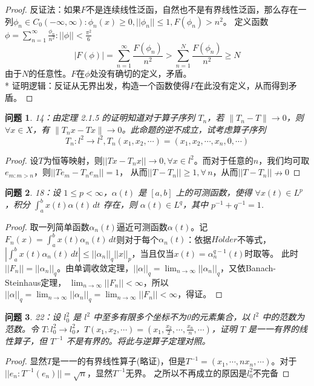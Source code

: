 \documentclass[a4paper, 12pt]{ctexart}
\newtheorem*{theorem}{问题}%
\begin{document}
\begin{proof}
反证法：如果$F$不是连续线性泛函，自然也不是有界线性泛函，那么存在一列$\phi_n \in C_0(-\infty,\infty):\phi_n(x)\geq 0,||\phi_n||\leq 1,F(\phi_n)>n^2$。
定义函数$\phi=\sum_{n=1}^\infty \frac{\phi _n}{n^2}:\lvert \lvert \phi \rvert\rvert <\frac{\pi^2}{6}$ $$|F(\phi)|=\sum_{n=1}^\infty \frac{F(\phi_{n})}{n^2} > \sum_{n=1}^N \frac{F(\phi_{n})}{n^2}\geq N$$
由于$N$的任意性。$F$在$\phi$处没有确切的定义，矛盾。
\\
* 证明逻辑：反证从无界出发，构造一个函数使得$F$在此没有定义，从而得到矛盾。
\end{proof}

\begin{theorem}
14：由定理 2.1.5 的证明知道对于算子序列 $T_n$，若 $\left\|T_n - T\right\| \rightarrow 0$，则 $\forall x \in X$，有 $\left\|T_n x - T x\right\| \rightarrow 0$。此命题的逆不成立，试考虑算子序列
$$T_n: l^2 \rightarrow l^2, T_n(x_1, x_2, \cdots) = (x_1, x_2, \cdots, x_n, 0, \cdots)$$
\end{theorem}
\begin{proof}
设$T$为恒等映射，则$||Tx-T_nx||\to 0, \forall x\in l^2$。而对于任意的$n$，我们均可取$e_{m:m>n}$，则$||Te_m-T_ne_m||=1$，
从而$||T-T_n||\geq 1,\forall \,n$，从而$||T-T_n|| \nrightarrow 0$
\end{proof}

\begin{theorem}
18：设 $1 \leqslant p < \infty$，$\alpha(t)$ 是 $[a,b]$ 上的可测函数，使得 $\forall x(t) \in L^p$，积分 $\int_{a}^{b} x(t) \alpha(t) \, dt$ 存在，则 $\alpha(t) \in L^q$，其中 $p^{-1} + q^{-1} = 1$.
\end{theorem}

\begin{proof}
取一列简单函数$\alpha_n(t)$逼近可测函数$\alpha(t)$。记$F_n(x)=\int_a^b x(t)\alpha_n(t)\,dt$则对于每个$\alpha_n(t)$：依据$H\dddot{o}lder$不等式，
$|\int_a^b x(t)\alpha_n(t)\,dt|\leq ||\alpha_n||_q||x||_p$，当且仅当$x(t)=\alpha_n^{q-1}(t)$时取等。
此时$||F_n||=||\alpha_n||_q$。由单调收敛定理，$||\alpha||_q=\lim_{n \to \infty}||\alpha_n||_q$，又依Banach-Steinhaus定理，
$\lim_{n \to \infty}||F_n||<\infty$，所以$||\alpha||_q=\lim_{n \to \infty}||\alpha_n||_q=\lim_{n \to \infty}||F_n||<\infty$，得证。
\end{proof}

\begin{theorem}
22：设 $l_{0}^{2}$ 是 $l^{2}$ 中至多有限多个坐标不为0的元素集合，以 $l^{2}$ 中的范数为范数。令 $T: l_{0}^{2} \rightarrow l_{0}^{2}$，$T(x_1, x_2, \cdots) = (x_1, \frac{x_2}{2}, \cdots, \frac{x_n}{n}, \cdots)$，证明 $T$ 是一一有界的线性算子，但 $T^{-1}$ 不是有界的。将此与逆算子定理对照。
\end{theorem}
\begin{proof}
显然$T$是一一的有界线性算子(略证)，但是$T^{-1}=(x_1,\cdots,nx_n,\cdots)$。对于$||e_n:T^{-1}(e_n)||=\sqrt{n}$，显然$T^{-1}$无界。
之所以不再成立的原因是$l_{0}^{2}$不完备
\end{proof}
\end{document}
